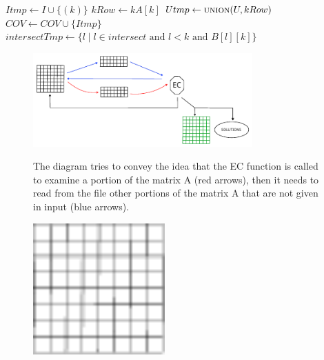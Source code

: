 \documentclass{beamer}
\begin{document}
\begin{frame}{}
    \scriptsize
    \begin{algorithmic}
                \State $Itmp \gets I \cup \{(k)\}$
                \State $kRow \gets kA[k]$
                \State $Utmp \gets \Call{union}{U, kRow}$
                    \State $COV \gets COV \cup \{Itmp\}$
                \Else {}
                    \State $intersectTmp \gets \{l \mid l \in intersect \text{ and } l<k \text{ and } B[l][k]\}$
                        \State {}
                    \EndIf
                \EndIf
            \EndFor
        \EndFunction
    \end{algorithmic}
\end{frame}


\begin{frame}{}
    \begin{figure}
        \centering
        \includegraphics[width=0.75\textwidth]{partial_loading_mech.pdf}
        \label{fig:partial_loading_mech}
        \caption{The diagram tries to convey the idea that the EC function 
        is called to examine a portion of the matrix A (red arrows), then it needs to 
        read from the file other portions of the matrix A that are not given in input (blue arrows).}
    \end{figure}
\end{frame}

\begin{frame}{}
    \begin{figure}
        \centering
        \includegraphics[width=0.45\textwidth]{grid_black.pdf}
        \label{fig:grid_black}
    \end{figure}
\end{frame}
\end{document}
